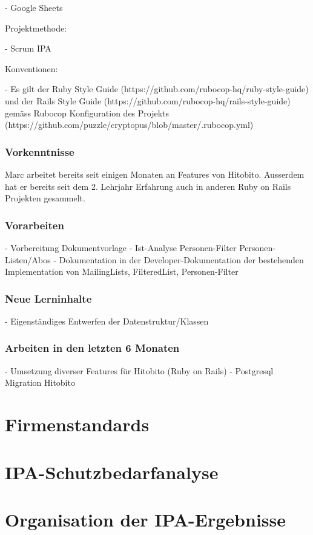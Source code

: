 - Google Sheets

Projektmethode:

- Scrum IPA

Konventionen:

- Es gilt der Ruby Style Guide (https://github.com/rubocop-hq/ruby-style-guide) und der Rails Style Guide (https://github.com/rubocop-hq/rails-style-guide) gemäss Rubocop Konfiguration des Projekts (https://github.com/puzzle/cryptopus/blob/master/.rubocop.yml)



\subsection{Vorkenntnisse}
Marc arbeitet bereits seit einigen Monaten an Features von Hitobito. Ausserdem hat er bereits seit dem 2. Lehrjahr Erfahrung auch in anderen Ruby on Rails Projekten gesammelt.

\subsection{Vorarbeiten}
- Vorbereitung Dokumentvorlage
- Ist-Analyse Personen-Filter Personen-Listen/Abos
- Dokumentation in der Developer-Dokumentation der bestehenden Implementation von MailingLists, FilteredList, Personen-Filter

\subsection{Neue Lerninhalte}
- Eigenständiges Entwerfen der Datenstruktur/Klassen

\subsection{Arbeiten in den letzten 6 Monaten}

- Umsetzung diverser Features für Hitobito (Ruby on Rails)
- Postgresql Migration Hitobito

\chapter{Firmenstandards}

\chapter{IPA-Schutzbedarfanalyse}

\chapter{Organisation der IPA-Ergebnisse}

